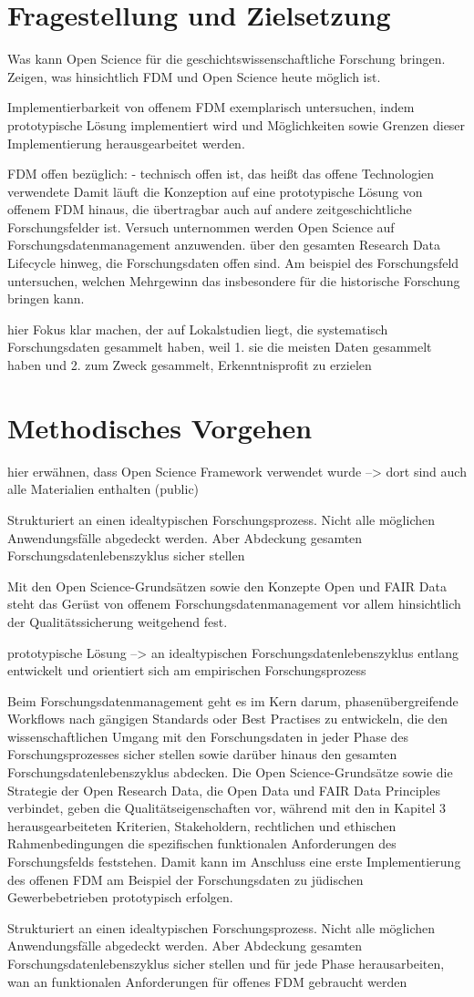 \section{Fragestellung und Zielsetzung}

Was kann Open Science für die geschichtswissenschaftliche Forschung bringen. 
Zeigen, was hinsichtlich FDM und Open Science heute möglich ist.

Implementierbarkeit von offenem FDM exemplarisch untersuchen, indem prototypische Lösung implementiert wird und Möglichkeiten sowie Grenzen dieser Implementierung herausgearbeitet werden.   

FDM offen bezüglich:
- technisch offen ist, das heißt das offene Technologien verwendete
Damit läuft die Konzeption auf eine prototypische Lösung von offenem FDM hinaus, die übertragbar auch auf andere zeitgeschichtliche Forschungsfelder ist.
Versuch unternommen werden Open Science auf Forschungsdatenmanagement anzuwenden. über den gesamten Research Data Lifecycle hinweg, die Forschungsdaten offen sind. Am beispiel des Forschungsfeld untersuchen, welchen Mehrgewinn das insbesondere für die historische Forschung bringen kann. 

 hier Fokus klar machen, der auf Lokalstudien liegt, die systematisch Forschungsdaten gesammelt haben, weil 1. sie die meisten Daten gesammelt haben und 2. zum Zweck gesammelt, Erkenntnisprofit zu erzielen

\section{Methodisches Vorgehen}

hier erwähnen, dass Open Science Framework verwendet wurde --> dort sind auch alle Materialien enthalten (public)

Strukturiert an einen idealtypischen Forschungsprozess. Nicht alle möglichen Anwendungsfälle abgedeckt werden. Aber Abdeckung gesamten Forschungsdatenlebenszyklus sicher stellen

Mit den Open Science-Grundsätzen sowie den Konzepte Open und FAIR Data steht das Gerüst von offenem Forschungsdatenmanagement vor allem hinsichtlich der Qualitätssicherung weitgehend fest.

prototypische Lösung --> an idealtypischen Forschungsdatenlebenszyklus entlang entwickelt und orientiert sich am empirischen Forschungsprozess

Beim Forschungsdatenmanagement geht es im Kern darum, phasenübergreifende Workflows nach gängigen Standards oder Best Practises zu entwickeln, die den wissenschaftlichen Umgang mit den Forschungsdaten in jeder Phase des Forschungsprozesses sicher stellen sowie darüber hinaus den gesamten Forschungsdatenlebenszyklus abdecken. Die Open Science-Grundsätze sowie die Strategie der Open Research Data, die Open Data und FAIR Data Principles verbindet, geben die Qualitätseigenschaften vor, während mit den in Kapitel 3 herausgearbeiteten Kriterien, Stakeholdern, rechtlichen und ethischen Rahmenbedingungen die spezifischen funktionalen Anforderungen des Forschungsfelds feststehen. Damit kann im Anschluss eine erste Implementierung des offenen FDM am Beispiel der Forschungsdaten zu jüdischen Gewerbebetrieben prototypisch erfolgen.

Strukturiert an einen idealtypischen Forschungsprozess. Nicht alle möglichen Anwendungsfälle abgedeckt werden. Aber Abdeckung gesamten Forschungsdatenlebenszyklus sicher stellen und für jede Phase herausarbeiten, wan an funktionalen Anforderungen für offenes FDM gebraucht werden
